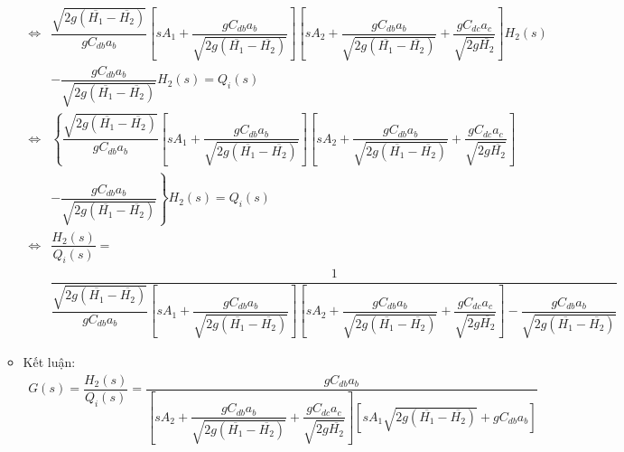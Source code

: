 \begin{enumerate}[\it a.]
\begin{itemize}
\begin{align}
                        \Longleftrightarrow & \dfrac{\sqrt{2g(\overline{H_1} - \overline{H_2})}}{g C_{db}a_b} \left[{s A_1 + \dfrac{gC_{db}a_b}{\sqrt{2g(\overline{H_1} - \overline{H_2})}}}\right] \left[{s A_2 + \dfrac{g C_{db}a_b}{\sqrt{2g(\overline{H_1} - \overline{H_2})}} + \dfrac{g C_{dc}a_c}{\sqrt{2g\overline{H_2}}}}\right] H_2(s) \nonumber \\
                        & - \dfrac{gC_{db}a_b}{\sqrt{2g(\overline{H_1} - \overline{H_2})}} H_2(s) = Q_i(s) \\
                        \Longleftrightarrow & \left\{{\dfrac{\sqrt{2g(\overline{H_1} - \overline{H_2})}}{g C_{db}a_b} \left[{s A_1 + \dfrac{gC_{db}a_b}{\sqrt{2g(\overline{H_1} - \overline{H_2})}}}\right] \left[{s A_2 + \dfrac{g C_{db}a_b}{\sqrt{2g(\overline{H_1} - \overline{H_2})}} + \dfrac{g C_{dc}a_c}{\sqrt{2g\overline{H_2}}}}\right]}\right. \nonumber \\
                        & \left.{- \dfrac{gC_{db}a_b}{\sqrt{2g(\overline{H_1} - \overline{H_2})}}}\right\} H_2(s) = Q_i(s) \\
                        \Longleftrightarrow & \dfrac{H_2(s)}{Q_i(s)} = \nonumber \\
                        & \dfrac{1}{\dfrac{\sqrt{2g(\overline{H_1} - \overline{H_2})}}{g C_{db}a_b} \left[{s A_1 + \dfrac{gC_{db}a_b}{\sqrt{2g(\overline{H_1} - \overline{H_2})}}}\right] \left[{s A_2 + \dfrac{g C_{db}a_b}{\sqrt{2g(\overline{H_1} - \overline{H_2})}} + \dfrac{g C_{dc}a_c}{\sqrt{2g\overline{H_2}}}}\right] - \dfrac{gC_{db}a_b}{\sqrt{2g(\overline{H_1} - \overline{H_2})}}}
                    \end{align}

                \item Kết luận:
                    \begin{align}
                        G(s) = \dfrac{H_2(s)}{Q_i(s)} = \dfrac{g C_{db}a_b}{\left[{s A_2 + \dfrac{g C_{db}a_b}{ \sqrt{2g(\overline{H_1} - \overline{H_2})}} + \dfrac{g C_{dc}a_c}{\sqrt{2g\overline{H_2}}}}\right] \left[{ s A_1 \sqrt{2g(\overline{H_1} - \overline{H_2})} + gC_{db}a_b}\right]}
                    \end{align}
            \end{itemize}
    \end{enumerate}
